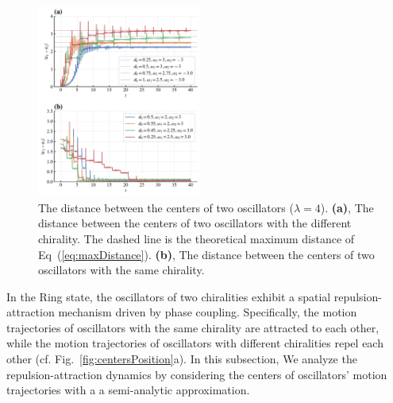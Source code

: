 \documentclass[%
 aip,
 amsmath,amssymb,
 reprint,%
]{revtex4-1}
\begin{document}
\begin{figure}[b]
    \includegraphics[width=0.48\textwidth]{./figs/2OsCenterDistance.pdf}
    \caption{
        \label{fig:2OsCenterDistance} The distance between the centers of two oscillators ($\lambda=4$). 
        \textbf{(a)}, The distance between the centers of two oscillators with the different chirality. The dashed line is the theoretical maximum distance of Eq~(\ref{eq:maxDistance}).
        \textbf{(b)}, The distance between the centers of two oscillators with the same chirality.
    }
\end{figure}

In the Ring state, the oscillators of two chiralities exhibit a spatial repulsion-attraction mechanism driven by phase coupling. Specifically, the motion trajectories of oscillators with the same chirality are attracted to each other, while the motion trajectories of oscillators with different chiralities repel each other (cf. Fig.~\ref{fig:centersPosition}a). 
In this subsection, We analyze the repulsion-attraction dynamics by considering the centers of oscillators' motion trajectories with a a semi-analytic approximation.
\end{document}
